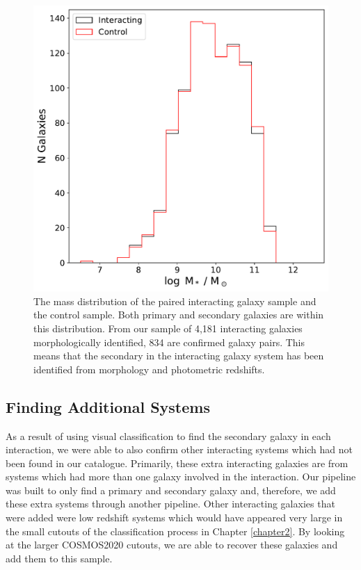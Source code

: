 \begin{figure}
    \centering
    \includegraphics[width=\textwidth]{Chapter3/figures/mass-matching-pairs.pdf}
    \caption[The mass distribution of the paired interacting galaxy sample and the control sample.]{The mass distribution of the paired interacting galaxy sample and the control sample. Both primary and secondary galaxies are within this distribution. From our sample of 4,181 interacting galaxies morphologically identified, 834 are confirmed galaxy pairs. This means that the secondary in the interacting galaxy system has been identified from morphology and photometric redshifts.}
    \label{fig:matched-distributions}
\end{figure}

\subsection{Finding Additional Systems}
\noindent As a result of using visual classification to find the secondary galaxy in each interaction, we were able to also confirm other interacting systems which had not been found in our catalogue. Primarily, these extra interacting galaxies are from systems which had more than one galaxy involved in the interaction. Our pipeline was built to only find a primary and secondary galaxy and, therefore, we add these extra systems through another pipeline. Other interacting galaxies that were added were low redshift systems which would have appeared very large in the small cutouts of the classification process in Chapter \ref{chapter2}. By looking at the larger COSMOS2020 cutouts, we are able to recover these galaxies and add them to this sample.

